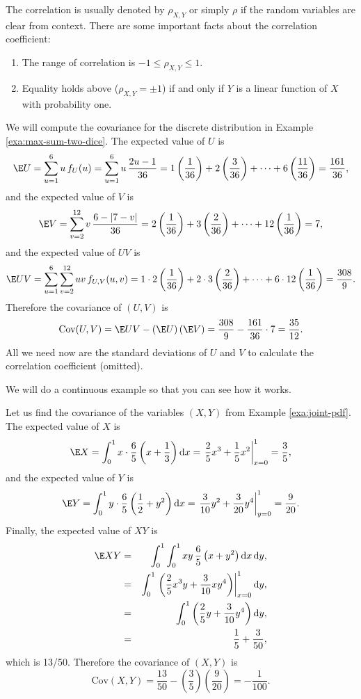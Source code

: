 \documentclass[captions=tableheading]{scrbook}
\begin{document}
The correlation is usually denoted by \(\rho_{X,Y}\) or simply \(\rho\) if the random variables are clear from context. There are some important facts about the correlation coefficient: 
\begin{enumerate}
\item The range of correlation is \(-1\leq\rho_{X,Y}\leq1\).
\item Equality holds above (\(\rho_{X,Y}=\pm1\)) if and only if \(Y\) is a linear function of \(X\) with probability one.
\end{enumerate}


\begin{example}
\label{exa:max-sum-dice-covariance}

We will compute the covariance for the discrete distribution in Example \ref{exa:max-sum-two-dice}. The expected value of \(U\) is
\[
\E U=\sum_{u=1}^{6}u\, f_{U}(u)=\sum_{u=1}^{6}u\,\frac{2u-1}{36}=1\left(\frac{1}{36}\right)+2\left(\frac{3}{36}\right)+\cdots+6\left(\frac{11}{36}\right)=\frac{161}{36},
\]
and the expected value of \(V\) is
\[
\E V=\sum_{v=2}^{12}v\,\frac{6-|7-v|}{36}=2\left(\frac{1}{36}\right)+3\left(\frac{2}{36}\right)+\cdots+12\left(\frac{1}{36}\right)=7,
\]
and the expected value of \(UV\) is
\[
\E UV=\sum_{u=1}^{6}\sum_{v=2}^{12}uv\, f_{U,V}(u,v)=1\cdot2\left(\frac{1}{36}\right)+2\cdot3\left(\frac{2}{36}\right)+\cdots+6\cdot12\left(\frac{1}{36}\right)=\frac{308}{9}.
\]
Therefore the covariance of \((U,V)\) is
\[
\mbox{Cov}(U,V)=\E UV-\left(\E U\right)\left(\E V\right)=\frac{308}{9}-\frac{161}{36}\cdot7=\frac{35}{12}.
\]
All we need now are the standard deviations of \(U\) and \(V\) to calculate the correlation coefficient (omitted).
\end{example}

We will do a continuous example so that you can see how it works.

\begin{example}

Let us find the covariance of the variables \((X,Y)\) from Example \ref{exa:joint-pdf}. The expected value of \(X\) is
\[
\E X=\int_{0}^{1}x\cdot\frac{6}{5}\left(x+\frac{1}{3}\right)\mathrm{d} x=\left.\frac{2}{5}x^{3}+\frac{1}{5}x^{2}\right|_{x=0}^{1}=\frac{3}{5},
\]
and the expected value of \(Y\) is
\[
\E Y=\int_{0}^{1}y\cdot\frac{6}{5}\left(\frac{1}{2}+y^{2}\right)\mathrm{d} x=\left.\frac{3}{10}y^{2}+\frac{3}{20}y^{4}\right|_{y=0}^{1}=\frac{9}{20}.
\]
Finally, the expected value of \(XY\) is
\begin{eqnarray*}
\E XY & = & \int_{0}^{1}\int_{0}^{1}xy\,\frac{6}{5}\left(x+y^{2}\right)\mathrm{d} x\,\mathrm{d} y,\\
 & = & \int_{0}^{1}\left.\left(\frac{2}{5}x^{3}y+\frac{3}{10}xy^{4}\right)\right|_{x=0}^{1}\mathrm{d} y,\\
 & = & \int_{0}^{1}\left(\frac{2}{5}y+\frac{3}{10}y^{4}\right)\mathrm{d} y,\\
 & = & \frac{1}{5}+\frac{3}{50},
\end{eqnarray*}
which is 13/50. Therefore the covariance of \((X,Y)\) is
\[
\mbox{Cov}(X,Y)=\frac{13}{50}-\left(\frac{3}{5}\right)\left(\frac{9}{20}\right)=-\frac{1}{100}.
\]
\end{example}
\end{document}
